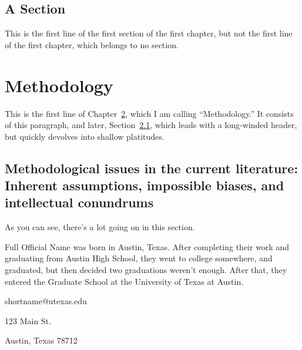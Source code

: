 \documentclass{utexasthesis}
\begin{document}
\section{A Section}

This is the first line of the first section of the first chapter, but not the first line of the first chapter, which belongs to no section.


\chapter{Methodology}
\label{chap:methodology}

This is the first line of Chapter~\ref{chap:methodology}, which I am calling ``Methodology.''
It consists of this paragraph, and later, Section~\ref{sec:method-issues}, which leads with a long-winded header, but quickly devolves into shallow platitudes.

\section{Methodological issues in the current literature: Inherent assumptions, impossible biases, and intellectual conundrums}
\label{sec:method-issues}

As you can see, there's a lot going on in this section.


\begin{vita}
  Full Official Name was born in Austin, Texas. After completing their work and graduating from Austin High School, they went to college somewhere, and graduated, but then decided two graduations weren't enough.
  After that, they entered the Graduate School at the University of Texas at Austin.

  \begin{address}
    shortname@utexas.edu

    123 Main St.

    Austin, Texas 78712
  \end{address}

\end{vita}
\end{document}
